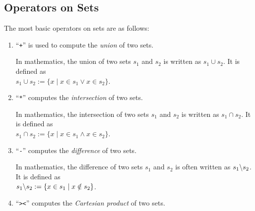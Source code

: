 \subsection{Operators on Sets}
The most basic operators on sets are as follows:
\begin{enumerate}
\item ``\texttt{+}'' is used to compute the \emph{union} of two sets.

      In mathematics, the union of two sets $s_1$ and $s_2$ is  written
      as $s_1 \cup s_2$.  It is defined as
      \\[0.2cm]
      \hspace*{1.3cm}
      $s_1 \cup s_2 := \{ x \mid x \in s_1 \vee x \in  s_2 \}$.
\item ``\texttt{*}'' computes the \emph{intersection} of two sets. 

      In mathematics, the intersection of two sets $s_1$ and $s_2$ is  written
      as $s_1 \cap s_2$.  It is defined as
      \\[0.2cm]
      \hspace*{1.3cm}
      $s_1 \cap s_2 := \{ x \mid x \in s_1 \wedge x \in  s_2 \}$.
\item ``\texttt{-}'' computes the \emph{difference} of two sets.

      In mathematics, the difference of two sets $s_1$ and $s_2$ is often written
      as $s_1 \symbol{92} s_2$.  It is defined as
      \\[0.2cm]
      \hspace*{1.3cm}
      $s_1 \symbol{92} s_2 := \{ x \in s_1 \mid x \notin s_2 \}$.
\item ``\texttt{><}'' computes the \emph{Cartesian product} of two sets.


\end{enumerate}
